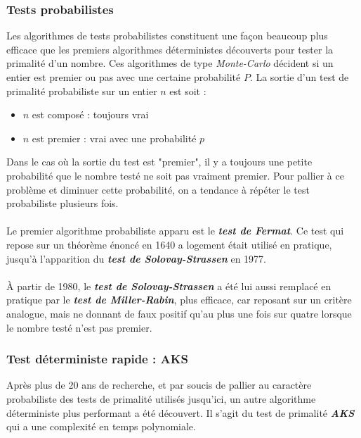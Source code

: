 		\subsubsection*{Tests probabilistes}
			Les algorithmes de tests probabilistes constituent une façon beaucoup plus efficace que les premiers algorithmes déterministes découverts pour tester la primalité d'un nombre. Ces algorithmes de type \textit{Monte-Carlo} décident si un entier est premier ou pas avec une certaine probabilité $P$. La sortie d'un test de primalité probabiliste sur un entier $n$ est soit :
			\begin{itemize}
				\item $n$ est composé : toujours vrai
				\item $n$ est premier : vrai avec une probabilité $p$
			\end{itemize}
			Dans le cas où la sortie du test est "premier", il y a toujours une petite probabilité que le nombre testé ne soit pas vraiment premier. Pour pallier à ce problème et diminuer cette probabilité, on a tendance à répéter le test probabiliste plusieurs fois.
			
			\paragraph{}Le premier algorithme probabiliste apparu est le \textit{\textbf{test de Fermat}}. Ce test qui repose sur un théorème énoncé en 1640 a logement était utilisé en pratique, jusqu'à l'apparition du \textit{\textbf{test de Solovay-Strassen}} en 1977. 
			
			\paragraph{} À partir de 1980, le \textit{\textbf{test de Solovay-Strassen}} a été lui aussi remplacé en pratique par le \textit{\textbf{test de Miller-Rabin}}, plus efficace, car reposant sur un critère analogue, mais ne donnant de faux positif qu'au plus une fois sur quatre lorsque le nombre testé n'est pas premier.
			
		\subsubsection*{Test déterministe rapide : AKS}
			Après plus de 20 ans de recherche, et par soucis de pallier au caractère probabiliste des tests de primalité utilisés jusqu'ici, un autre algorithme déterministe plus performant a été découvert. Il s'agit du test de primalité \textit{\textbf{AKS}} qui a une complexité en temps polynomiale.
